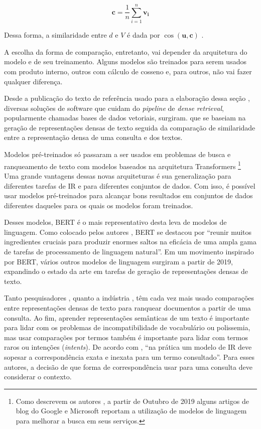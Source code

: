 \documentclass[
	12pt,				%
	openright,			%
	oneside,			%
	a4paper,			%
	english,			%
	french,				%
	spanish,			%
	brazil				%
	]{abntex2}
\begin{document}
\begin{equation}
\mathbf{c} = \frac{1}{n} \sum_{i=1}^{n} \mathbf{v_i}
\label{eq:centroid}
\end{equation}

Dessa forma, a similaridade entre $d$ e $V$ é dada por $\cos⁡ (\mathbf{u},\mathbf{c})$ .

A escolha da forma de comparação, entretanto, vai depender da arquitetura do modelo e de seu treinamento. Alguns modelos são treinados para serem usados com produto interno, outros com cálculo de cosseno e, para outros, não vai fazer qualquer diferença.

Desde a publicação do texto de referência usado para a elaboração dessa seção \cite{}, diversas soluções de software que cuidam do \textit{pipeline} de \textit{dense retrieval}, popularmente chamadas bases de dados vetoriais, surgiram.
que se baseiam na geração de representações densas de texto seguida da comparação de similaridade entre a representação densa de uma consulta e dos textos.



Modelos pré-treinados só passaram a ser usados em problemas de busca e ranqueamento de texto com modelos baseados na arquitetura Transformers \cite{}
\footnote{Como descrevem os autores \citeauthor{}, a partir de Outubro de 2019 alguns artigos de blog do Google e Microsoft reportam a utilização de modelos de linguagem para melhorar a busca em seus serviços.}
\cite{DBLP:journals/corr/abs-1810-04805}
Uma grande vantagens dessas novas arquiteturas é sua generalização para diferentes tarefas de IR e para diferentes conjuntos de dados. \cite{}
Com isso, é possível usar modelos pré-treinados para alcançar bons resultados em conjuntos de dados diferentes daqueles para os quais os modelos foram treinados. \cite{}

Desses modelos, BERT \cite{} é o mais representativo desta leva de modelos de linguagem.
Como colocado pelos autores \citeauthor{}, BERT se destacou por ``reunir muitos ingredientes cruciais para produzir enormes saltos na eficácia de uma ampla gama de tarefas de processamento de linguagem natural''.
Em um movimento inspirado por BERT, vários outros modelos de linguagem surgiram a partir de 2019, expandindo o estado da arte em tarefas de geração de representações densas de texto.

Tanto pesquisadores \cite{}, quanto a indústria \cite{}, têm cada vez mais usado comparações entre representações densas de texto para ranquear documentos a partir de uma consulta.
Ao fim, aprender representações semânticas de um texto é importante para lidar com os problemas de incompatibilidade de vocabulário ou polissemia, mas usar comparações por termos também é importante para lidar com termos raros ou intenções (\textit{intents}). \cite{bhaskar-craswell-2018}
De acordo com \citeauthor{bhaskar-craswell-2018}, ``na prática um modelo de IR deve sopesar a correspondência exata e inexata para um termo consultado''. Para esses autores, a decisão de que forma de correspondência usar para uma consulta deve considerar o contexto.
\end{document}
